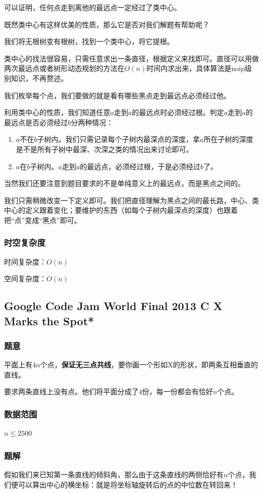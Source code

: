 \documentclass{ctexart}
\begin{document}
可以证明，任何点走到离他的最远点一定经过了类中心。

既然类中心有这样优美的性质，那么它是否对我们解题有帮助呢？

我们将无根树变有根树，找到一个类中心，将它提根。

类中心的找法很容易，只需任意求出一条直径，根据定义来找即可。直径可以用做两次最远点或者树形动态规划的方法在$O(n)$时间内求出来，具体算法是noip级别知识，不再赘述。

我们枚举每个点，我们要做的就是看有哪些黑点走到最远点必须经过他。

利用类中心的性质，我们知道任意$a$走到$a$的最远点时必须经过根。判定$a$走到$a$的最远点是否必须经过$b$分两种情况：

\begin{enumerate}
\item $a$不在$b$子树内。我们只需记录每个子树内最深点的深度，拿$a$所在子树的深度是不是所有子树中最深、次深之类的情况出来讨论即可。
\item $a$在$b$子树内。$a$走到$a$的最远点，必须经过根，于是必须经过$b$了。
\end{enumerate}

当然我们还要注意到题目要求的不是单纯意义上的最远点，而是黑点之间的。

我们只需稍微改变一下定义即可。我们把直径理解为黑点之间的最长路，中心、类中心的定义跟着变化；要维护的东西（如每个子树内最深点的深度）也跟着把``点''变成``黑点''即可。
\subsubsection{时空复杂度}
时间复杂度：$O(n)$

空间复杂度：$O(n)$
\subsection{Google Code Jam World Final 2013 C X Marks the Spot*}
\subsubsection{题意}
平面上有$4n$个点，\textbf{保证无三点共线}，要你画一个形如X的形状，即两条互相垂直的直线。

要求两条直线上没有点。他们将平面分成了$4$份，每一份都会有恰好$n$个点。
\subsubsection{数据范围}
$n \le 2500$
\subsubsection{题解}
假如我们来已知第一条直线的倾斜角，那么由于这条直线的两侧恰好有$n$个点，我们便可以算出中心的横坐标：就是将坐标轴旋转后的点的中位数在转回来！
\end{document}
